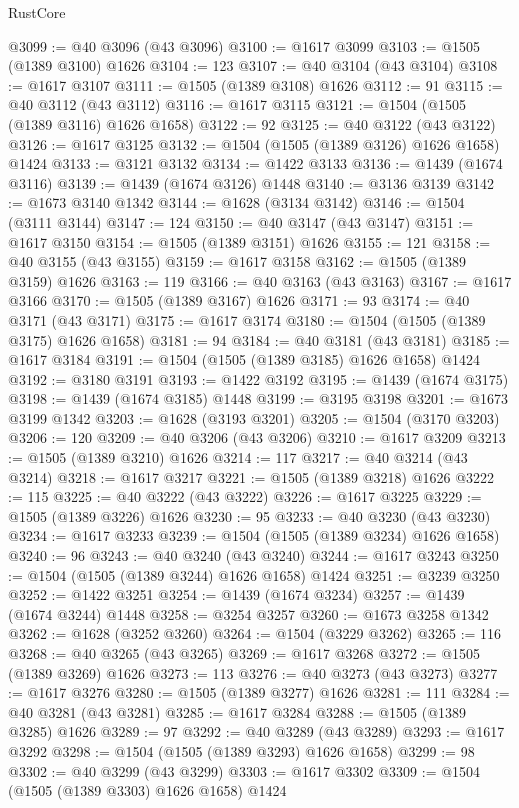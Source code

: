 \begin{lexlean}{RustCore}
\begin{coremodule}
@3099 := @40 @3096 (@43 @3096)
@3100 := @1617 @3099
@3103 := @1505 (@1389 @3100) @1626
@3104 := 123
@3107 := @40 @3104 (@43 @3104)
@3108 := @1617 @3107
@3111 := @1505 (@1389 @3108) @1626
@3112 := 91
@3115 := @40 @3112 (@43 @3112)
@3116 := @1617 @3115
@3121 := @1504 (@1505 (@1389 @3116) @1626 @1658)
@3122 := 92
@3125 := @40 @3122 (@43 @3122)
@3126 := @1617 @3125
@3132 := @1504 (@1505 (@1389 @3126) @1626 @1658) @1424
@3133 := @3121 @3132
@3134 := @1422 @3133
@3136 := @1439 (@1674 @3116)
@3139 := @1439 (@1674 @3126) @1448
@3140 := @3136 @3139
@3142 := @1673 @3140 @1342
@3144 := @1628 (@3134 @3142)
@3146 := @1504 (@3111 @3144)
@3147 := 124
@3150 := @40 @3147 (@43 @3147)
@3151 := @1617 @3150
@3154 := @1505 (@1389 @3151) @1626
@3155 := 121
@3158 := @40 @3155 (@43 @3155)
@3159 := @1617 @3158
@3162 := @1505 (@1389 @3159) @1626
@3163 := 119
@3166 := @40 @3163 (@43 @3163)
@3167 := @1617 @3166
@3170 := @1505 (@1389 @3167) @1626
@3171 := 93
@3174 := @40 @3171 (@43 @3171)
@3175 := @1617 @3174
@3180 := @1504 (@1505 (@1389 @3175) @1626 @1658)
@3181 := 94
@3184 := @40 @3181 (@43 @3181)
@3185 := @1617 @3184
@3191 := @1504 (@1505 (@1389 @3185) @1626 @1658) @1424
@3192 := @3180 @3191
@3193 := @1422 @3192
@3195 := @1439 (@1674 @3175)
@3198 := @1439 (@1674 @3185) @1448
@3199 := @3195 @3198
@3201 := @1673 @3199 @1342
@3203 := @1628 (@3193 @3201)
@3205 := @1504 (@3170 @3203)
@3206 := 120
@3209 := @40 @3206 (@43 @3206)
@3210 := @1617 @3209
@3213 := @1505 (@1389 @3210) @1626
@3214 := 117
@3217 := @40 @3214 (@43 @3214)
@3218 := @1617 @3217
@3221 := @1505 (@1389 @3218) @1626
@3222 := 115
@3225 := @40 @3222 (@43 @3222)
@3226 := @1617 @3225
@3229 := @1505 (@1389 @3226) @1626
@3230 := 95
@3233 := @40 @3230 (@43 @3230)
@3234 := @1617 @3233
@3239 := @1504 (@1505 (@1389 @3234) @1626 @1658)
@3240 := 96
@3243 := @40 @3240 (@43 @3240)
@3244 := @1617 @3243
@3250 := @1504 (@1505 (@1389 @3244) @1626 @1658) @1424
@3251 := @3239 @3250
@3252 := @1422 @3251
@3254 := @1439 (@1674 @3234)
@3257 := @1439 (@1674 @3244) @1448
@3258 := @3254 @3257
@3260 := @1673 @3258 @1342
@3262 := @1628 (@3252 @3260)
@3264 := @1504 (@3229 @3262)
@3265 := 116
@3268 := @40 @3265 (@43 @3265)
@3269 := @1617 @3268
@3272 := @1505 (@1389 @3269) @1626
@3273 := 113
@3276 := @40 @3273 (@43 @3273)
@3277 := @1617 @3276
@3280 := @1505 (@1389 @3277) @1626
@3281 := 111
@3284 := @40 @3281 (@43 @3281)
@3285 := @1617 @3284
@3288 := @1505 (@1389 @3285) @1626
@3289 := 97
@3292 := @40 @3289 (@43 @3289)
@3293 := @1617 @3292
@3298 := @1504 (@1505 (@1389 @3293) @1626 @1658)
@3299 := 98
@3302 := @40 @3299 (@43 @3299)
@3303 := @1617 @3302
@3309 := @1504 (@1505 (@1389 @3303) @1626 @1658) @1424

\end{coremodule}
\end{lexlean}
